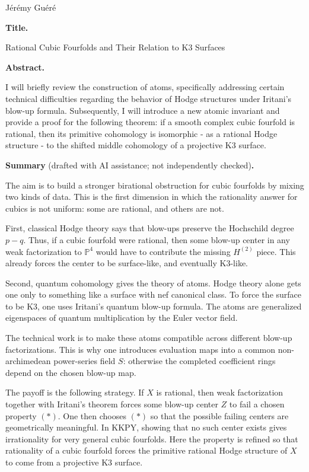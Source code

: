 J\'er\'emy Gu\'er\'e

\medskip\noindent
{\bf Title.}

Rational Cubic Fourfolds and Their
Relation to K3 Surfaces

\medskip\noindent
{\bf Abstract.}

I will briefly review the construction
of atoms, specifically addressing
certain technical difficulties
regarding the behavior of Hodge
structures under Iritani's blow-up
formula. Subsequently, I will
introduce a new atomic invariant and
provide a proof for the following
theorem: if a smooth complex cubic
fourfold is rational, then its
primitive cohomology is isomorphic -
as a rational Hodge structure - to the
shifted middle cohomology of a
projective K3 surface.

\medskip\noindent
{\bf Summary} (drafted with AI assistance;
not independently checked){\bf .}

The aim is to build a stronger
birational obstruction for cubic
fourfolds by mixing two kinds of data.
This is the first dimension in which
the rationality answer for cubics is
not uniform: some are rational, and
others are not.

First, classical Hodge theory says that
blow-ups preserve the Hochschild degree
$p-q$.
Thus, if a cubic fourfold were
rational, then some blow-up center in
any weak factorization to
$\mathbb{P}^4$ would have to contribute
the missing $H^{(2)}$ piece.
This already forces the center to be
surface-like, and eventually K3-like.

Second, quantum cohomology gives the
theory of atoms.
Hodge theory alone gets one only to
something like a surface with nef
canonical class.
To force the surface to be K3, one
uses Iritani's quantum blow-up formula.
The atoms are generalized eigenspaces
of quantum multiplication by the Euler
vector field.

The technical work is to make these
atoms compatible across different
blow-up factorizations.
This is why one introduces evaluation
maps into a common non-archimedean
power-series field $S$:
otherwise the completed coefficient
rings depend on the chosen blow-up
map.

The payoff is the following strategy.
If $X$ is rational, then weak
factorization together with Iritani's
theorem forces some blow-up center
$Z$ to fail a chosen property $(*)$.
One then chooses $(*)$ so that the
possible failing centers are
geometrically meaningful.
In KKPY, showing that no such center
exists gives irrationality for very
general cubic fourfolds.
Here the property is refined so that
rationality of a cubic fourfold forces
the primitive rational Hodge structure
of $X$ to come from a projective K3
surface.

